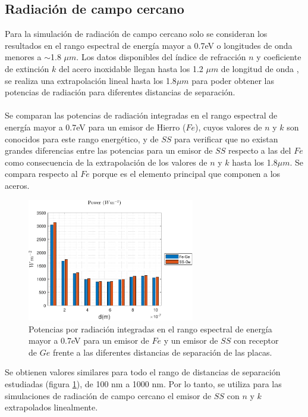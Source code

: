 \subsection{Radiación de campo cercano}
Para la simulación de radiación de campo cercano solo se consideran los resultados en el rango espectral de energía mayor a 0.7eV o longitudes de onda menores a $\sim$1.8 $\mu m$. Los datos disponibles del índice de refracción $n$ y coeficiente de extinción $k$ del acero inoxidable llegan hasta los 1.2 $\mu m$ de longitud de onda \cite{ss_optical_2017}, se realiza una extrapolación lineal hasta los 1.8$\mu m$ para poder obtener las potencias de radiación para diferentes distancias de separación.\\\\
Se comparan las potencias de radiación integradas en el rango espectral de energía mayor a 0.7eV para un emisor de Hierro ($Fe$), cuyos valores de $n$ y $k$ son conocidos para este rango energético, y de $SS$ para verificar que no existan grandes diferencias entre las potencias para un emisor de $SS$ respecto a las del $Fe$ como consecuencia de la extrapolación de los valores de $n$ y $k$ hasta los 1.8$\mu m$. Se compara respecto al $Fe$ porque es el elemento principal que componen a los aceros.
\begin{figure}[H]
	\centering
		\includegraphics[width=0.65\textwidth]{figuras/rad_mat/FevsSs.pdf}
	\caption{Potencias por radiación integradas en el rango espectral de energía mayor a 0.7eV para un emisor de $Fe$ y un emisor de $SS$ con receptor de $Ge$ frente a las diferentes distancias de separación de las placas.}
	\label{fig:FevsSs}
\end{figure}
Se obtienen valores similares para todo el rango de distancias de separación estudiadas (figura \ref{fig:FevsSs}), de 100 nm a 1000 nm. Por lo tanto, se utiliza para las simulaciones de radiación de campo cercano el emisor de $SS$ con $n$ y $k$ extrapolados linealmente.\\\\
